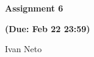 \documentclass{article}
\begin{document}
\rhead{\thepage}

\pagestyle{fancy}

\cfoot{}

\begin{center}

\large{\textbf{Assignment 6}}

\textbf{(Due: Feb 22 23:59)}

Ivan Neto

\end{center}

\vskip 0.2in




\end{document}
